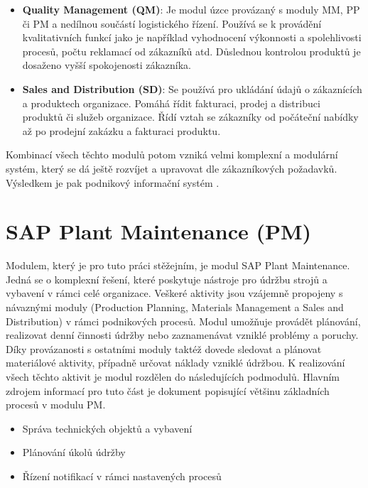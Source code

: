 \documentclass[thesis=M,czech]{FITthesis}[2012/06/26]
\begin{document}
\begin{itemize}
	\item
	\textbf{Quality Management (QM)}: Je modul úzce provázaný s moduly MM, PP či PM a nedílnou součástí logistického řízení. Používá se k provádění kvalitativních funkcí jako je například vyhodnocení výkonnosti a spolehlivosti procesů, počtu reklamací od zákazníků atd. Důslednou kontrolou produktů je dosaženo vyšší spokojenosti zákazníka.
	\item
	\textbf{Sales and Distribution (SD)}: Se používá pro ukládání údajů o zákaznících a produktech organizace. Pomáhá řídit fakturaci, prodej a distribuci produktů či služeb organizace. Řídí vztah se zákazníky od počáteční nabídky až po prodejní zakázku a fakturaci produktu.   
\end{itemize} 	
Kombinací všech těchto modulů potom vzniká velmi komplexní a modulární systém, který se dá ještě rozvíjet a upravovat dle zákazníkových požadavků. Výsledkem je pak podnikový informační systém .

\section{SAP Plant Maintenance (PM)}
Modulem, který je pro tuto práci stěžejním, je modul SAP Plant Maintenance. Jedná se o komplexní řešení, které poskytuje nástroje pro údržbu strojů a vybavení v rámci celé organizace. Veškeré aktivity jsou vzájemně propojeny s návaznými moduly (Production Planning, Materials Management a Sales and Distribution) v rámci podnikových procesů. Modul umožňuje provádět plánování, realizovat denní činnosti údržby nebo zaznamenávat vzniklé problémy a poruchy. Díky provázanosti s ostatními moduly taktéž dovede sledovat a plánovat materiálové aktivity, případně určovat náklady vzniklé údržbou. K realizování všech těchto aktivit je modul rozdělen do následujících podmodulů. Hlavním zdrojem informací pro tuto část je dokument \cite{sap_pm_document} popisující většinu základních procesů v modulu PM.
\begin{itemize}
	\item
	Správa technických objektů a vybavení
	\item
	Plánování úkolů údržby
	\item
	Řízení notifikací v rámci nastavených procesů 
\end{itemize} 	
\end{document}
